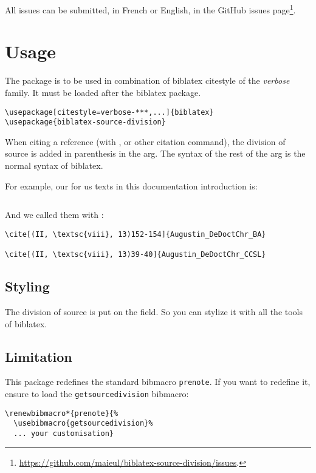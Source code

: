 \documentclass{ltxdockit}[2011/03/25]
\newcommand{\biblatex}{biblatex\xspace}
\begin{document}
All issues can be submitted, in French or English, in the GitHub issues page\footnote{\url{https://github.com/maieul/biblatex-source-division/issues}.}.

\section{Usage}

The package is to be used in combination of \biblatex citestyle of the \emph{verbose} family.
It must be loaded after the \biblatex package.
\begin{verbatim}
\usepackage[citestyle=verbose-***,...]{biblatex}
\usepackage{biblatex-source-division}
\end{verbatim}

When citing a reference (with ,  or other citation command),  the division of source is added in parenthesis in the  arg. The syntax of the rest of the  arg is the normal syntax of \biblatex.

For example, our  for us texts in this documentation introduction is:

\inputminted{tex}{biblatex-source-division.bib}

And we called them with :

\begin{verbatim}
\cite[(II, \textsc{viii}, 13)152-154]{Augustin_DeDoctChr_BA}

\cite[(II, \textsc{viii}, 13)39-40]{Augustin_DeDoctChr_CCSL}
\end{verbatim}

\subsection{Styling}

The division of source is put on the  field. So you can stylize it with all the tools of biblatex.

\subsection{Limitation}

This package redefines the standard bibmacro \verb+prenote+. If you want to redefine it, ensure to load the \verb+getsourcedivision+ bibmacro:

\begin{verbatim}
\renewbibmacro*{prenote}{%
  \usebibmacro{getsourcedivision}%
  ... your customisation}
\end{verbatim}
\end{document}
